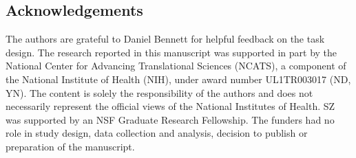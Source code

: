 \documentclass[a4paper,12pt]{article}
\begin{document}
\begin{refsection}[main]


\section*{Acknowledgements}

The authors are grateful to Daniel Bennett for helpful feedback on the task design. The research reported in this manuscript was supported in part by the National Center for Advancing Translational Sciences (NCATS), a component of the National Institute of Health (NIH), under award number UL1TR003017 (ND, YN). The content is solely the responsibility of the authors and does not necessarily represent the official views of the National Institutes of Health. SZ was supported by an NSF Graduate Research Fellowship. The funders had no role in study design, data collection and analysis, decision to publish or preparation of the manuscript.


\end{refsection}
\end{document}
